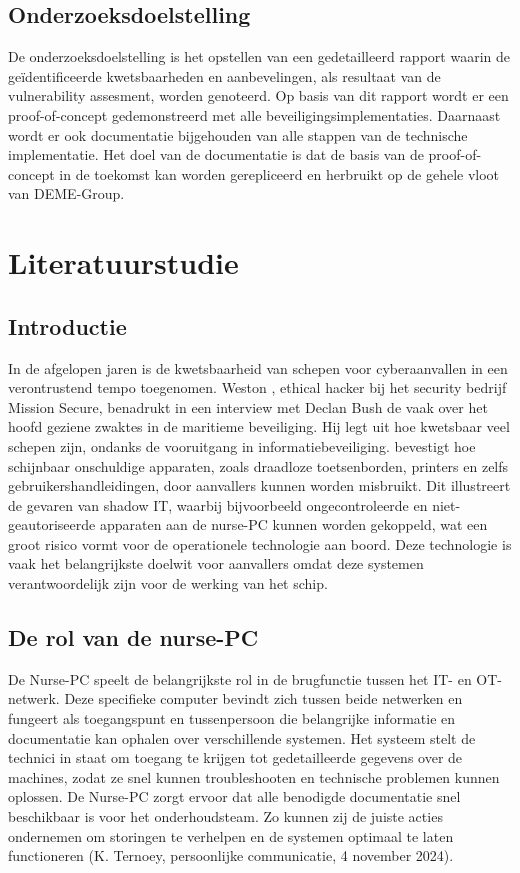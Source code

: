 \subsection{Onderzoeksdoelstelling}
De onderzoeksdoelstelling is het opstellen van een gedetailleerd rapport waarin de geïdentificeerde kwetsbaarheden en aanbevelingen, als resultaat van de vulnerability assesment, worden genoteerd.
Op basis van dit rapport wordt er een proof-of-concept gedemonstreerd met alle beveiligingsimplementaties.
Daarnaast wordt er ook documentatie bijgehouden van alle stappen van de technische implementatie.
Het doel van de documentatie is dat de basis van de proof-of-concept in de toekomst kan worden gerepliceerd en herbruikt op de gehele vloot van DEME-Group.



\section{Literatuurstudie}%
\label{sec:literatuurstudie}
\subsection{Introductie}
In de afgelopen jaren is de kwetsbaarheid van schepen voor cyberaanvallen in een verontrustend tempo toegenomen. Weston \textcite{Hecker2021}, ethical hacker bij het security bedrijf 
Mission Secure, benadrukt in een interview met Declan Bush de vaak over het hoofd geziene zwaktes in de maritieme beveiliging. Hij
legt uit hoe kwetsbaar veel schepen zijn, ondanks de vooruitgang in informatiebeveiliging. \textcite{Hecker2021} bevestigt hoe schijnbaar onschuldige apparaten, zoals draadloze toetsenborden, printers en 
zelfs gebruikershandleidingen, door aanvallers kunnen worden misbruikt. Dit illustreert de gevaren van shadow IT, waarbij bijvoorbeeld 
ongecontroleerde en niet-geautoriseerde apparaten aan de nurse-PC kunnen worden gekoppeld, wat een groot risico vormt voor de operationele technologie aan boord. 
Deze technologie is vaak het belangrijkste doelwit voor aanvallers omdat deze systemen verantwoordelijk zijn voor de werking van het schip.

\subsection{De rol van de nurse-PC}
De Nurse-PC speelt de belangrijkste rol in de brugfunctie tussen het IT- en OT-netwerk. Deze specifieke computer bevindt 
zich tussen beide netwerken en fungeert als toegangspunt en tussenpersoon die belangrijke informatie en documentatie kan ophalen over verschillende systemen.
Het systeem stelt de technici in staat om toegang te krijgen tot gedetailleerde gegevens over de 
machines, zodat ze snel kunnen troubleshooten en technische problemen kunnen oplossen. De Nurse-PC zorgt ervoor dat alle benodigde documentatie
snel beschikbaar is voor het onderhoudsteam. Zo kunnen zij de juiste acties ondernemen om storingen 
te verhelpen en de systemen optimaal te laten functioneren (K. Ternoey, persoonlijke communicatie, 4 november 2024).

